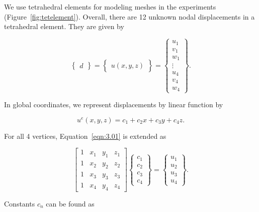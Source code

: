We use tetrahedral elements for modeling meshes in the experiments (Figure~\ref{fig:tetelement}). Overall, there are 12 unknown nodal displacements in a tetrahedral element. They are given by~\cite{Logan07}

\begin{equation}
\begin{Bmatrix}
 d
 \end{Bmatrix}
 =
 \begin{Bmatrix}
 u(x,y,z)
 \end{Bmatrix}
 =
\begin{Bmatrix} u_{1} \\ v_{1} \\ w_{1} \\ \vdots \\ u_{4} \\ v_{4} \\ w_{4} \end{Bmatrix}.
\label{eqn:3.3}
\end{equation}

\noindent In global coordinates, we represent displacements by linear function by

\begin{equation}
u^e(x,y,z) = c_{1} + c_{2}x + c_{3}y + c_{4}z.
\label{eqn:3.01}
\end{equation}

\noindent For all 4 vertices, Equation~\ref{eqn:3.01} is extended as

\begin{equation}
\begin{bmatrix}
1 & x_{1} & y_{1} & z_{1} \\
1 & x_{2} & y_{2} & z_{2} \\
1 & x_{3} & y_{3} & z_{3} \\
1 & x_{4} & y_{4} & z_{4}
\end{bmatrix}
\begin{Bmatrix}
c_{1} \\ c_{2} \\ c_{3}  \\ c_{4}
\end{Bmatrix}
=
\begin{Bmatrix}
u_{1} \\ u_{2} \\ u_{3}  \\ u_{4}
\end{Bmatrix}.
\label{eqn:3.02}
\end{equation}

\noindent Constants $c_{n}$ can be found as

